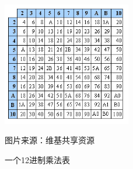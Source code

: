 \begin{figure}[htbp]
    \centering
    \includegraphics[width=0.5\textwidth]{../images/other_parts/C_duodecimal_multiplication_table.png}
    \caption{一个12进制乘法表}
    \footnotesize{图片来源：维基共享资源}
\end{figure}
